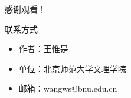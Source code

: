 \documentclass{beamer}
\begin{document}
\begin{frame}
  \centering
  \Huge 感谢观看！

  \vspace{1cm}

  \Large
  \begin{block}{联系方式}
    \begin{itemize}
      \item 作者：王惟是
      \item 单位：北京师范大学文理学院
      \item 邮箱：wangws@bnu.edu.cn
    \end{itemize}
  \end{block}
\end{frame}
\end{document}
